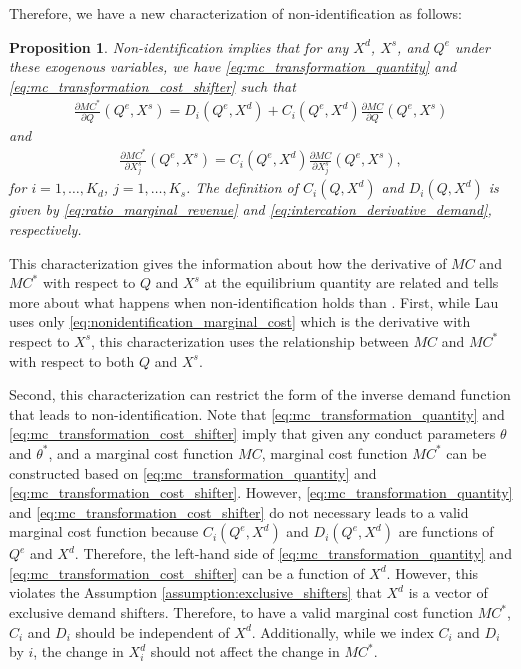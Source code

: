 \documentclass[11pt, a4paper]{article}
\newtheorem{proposition}{Proposition}
\theoremstyle{remark}
\begin{document}
Therefore, we have a new characterization of non-identification as follows:
\begin{proposition}\label{proposition:necessary_nonidentification}
    Non-identification implies that for any $X^{d}$, $X^{s}$, and $Q^e$ under these exogenous variables, we have \eqref{eq:mc_transformation_quantity} and \eqref{eq:mc_transformation_cost_shifter} such that
    \begin{align}
        \frac{\partial MC^{*}}{\partial Q}(Q^e, X^{s}) =D_i(Q^e, X^{d}) + C_i(Q^e, X^{d})\frac{\partial MC}{\partial Q}(Q^e, X^{s})
    \end{align}
    and
    \begin{align}
        \frac{\partial MC^{*}}{\partial X^{s}_j}(Q^e, X^{s}) = C_i(Q^e, X^{d})\frac{\partial MC}{\partial X^{s}_j}(Q^e, X^{s}),
    \end{align} 
    for $i = 1, \ldots, K_d$, $j = 1, \ldots, K_s$. The definition of $C_i(Q, X^{d})$ and $D_i(Q, X^{d})$ is given by \eqref{eq:ratio_marginal_revenue} and \eqref{eq:intercation_derivative_demand}, respectively.
\end{proposition}
This characterization gives the information about how the derivative of $MC$ and $MC^{*}$ with respect to $Q$ and $X^{s}$ at the equilibrium quantity are related and tells more about what happens when non-identification holds than \cite{lau1982identifying}.
First, while Lau uses only \eqref{eq:nonidentification_marginal_cost} which is the derivative with respect to $X^{s}$, this characterization uses the relationship between $MC$ and $MC^{*}$ with respect to both $Q$ and $X^{s}$.

Second, this characterization can restrict the form of the inverse demand function that leads to non-identification.
Note that \eqref{eq:mc_transformation_quantity} and \eqref{eq:mc_transformation_cost_shifter} imply that given any conduct parameters $\theta$ and $\theta^{*}$, and a marginal cost function $MC$, marginal cost function $MC^{*}$ can be constructed based on \eqref{eq:mc_transformation_quantity} and \eqref{eq:mc_transformation_cost_shifter}.
However, \eqref{eq:mc_transformation_quantity} and \eqref{eq:mc_transformation_cost_shifter} do not necessary leads to a valid marginal cost function because $C_i(Q^e, X^{d})$ and $D_i(Q^e, X^{d})$ are functions of $Q^e$ and $X^{d}$.
Therefore, the left-hand side of \eqref{eq:mc_transformation_quantity} and \eqref{eq:mc_transformation_cost_shifter} can be a function of $X^{d}$.
However, this violates the Assumption \ref{assumption:exclusive_shifters} that $X^{d}$ is a vector of exclusive demand shifters.
Therefore, to have a valid marginal cost function $MC^{*}$, $C_i$ and $D_i$ should be independent of $X^{d}$.
Additionally, while we index $C_i$ and $D_i$ by $i$, the change in $X^{d}_i$ should not affect the change in $MC^{*}$.
\end{document}

